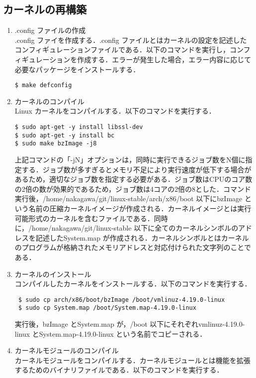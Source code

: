 \documentclass[12pt]{jsarticle}
\begin{document}
\subsection{カーネルの再構築}\label{sec:saikoutiku}
  \begin{enumerate}
  \item .config ファイルの作成\\
    .config ファイを作成する．.config ファイルとはカーネルの設定を記述したコンフィギュレーションファイルである．以下のコマンドを実行し，コンフィギュレーションを作成する．エラーが発生した場合，エラー内容に応じて必要なパッケージをインストールする．
\begin{verbatim}
$ make defconfig
\end{verbatim}
\item カーネルのコンパイル\\
  Linux カーネルをコンパイルする．以下のコマンドを実行する．
\begin{verbatim}
$ sudo apt-get -y install libssl-dev
$ sudo apt-get -y install bc
$ sudo make bzImage -j8
\end{verbatim}
上記コマンドの「-jN」オプションは，同時に実行できるジョブ数をN個に指定する．ジョブ数が多すぎるとメモリ不足により実行速度が低下する場合があるため，適切なジョブ数を指定する必要がある．ジョブ数はCPUのコア数の2倍の数が効果的であるため，ジョブ数は4コアの2倍の8とした．コマンド実行後，/home/nakagawa/git/linux-stable/arch/x86/boot 以下にbzImage という名前の圧縮カーネルイメージが作成される．カーネルイメージとは実行可能形式のカーネルを含むファイルである．同時に，/home/nakagawa/git/linux-stable 以下に全てのカーネルシンボルのアドレスを記述したSystem.map が作成される．カーネルシンボルとはカーネルのプログラムが格納されたメモリアドレスと対応付けられた文字列のことである．
\item カーネルのインストール\\
  コンパイルしたカーネルをインストールする．以下のコマンドを実行する．
\begin{verbatim}
 $ sudo cp arch/x86/boot/bzImage /boot/vmlinuz-4.19.0-linux
 $ sudo cp System.map /boot/System.map-4.19.0-linux
\end{verbatim}
実行後，bzImage とSystem.map が，/boot 以下にそれぞれvmlinuz-4.19.0-linux とSystem.map-4.19.0-linux という名前でコピーされる．
\item カーネルモジュールのコンパイル\\
  カーネルモジュールをコンパイルする．カーネルモジュールとは機能を拡張するためのバイナリファイルである．以下のコマンドを実行する．
\begin{verbatim}

\end{verbatim}
\end{enumerate}
\end{document}
